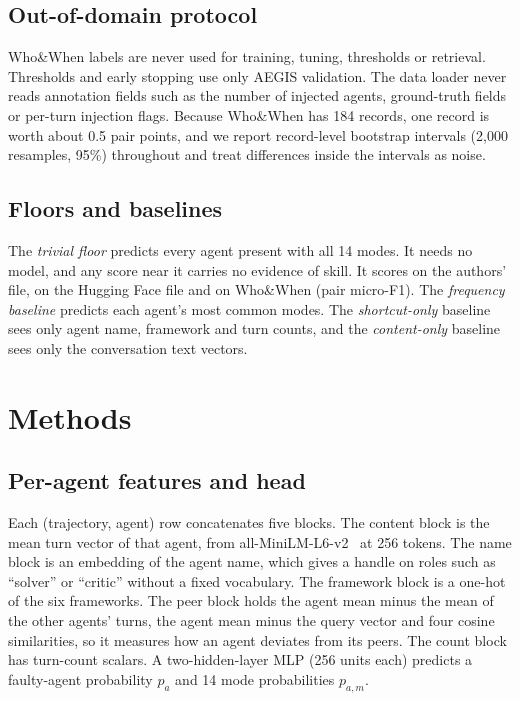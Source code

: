 \documentclass[conference]{IEEEtran}
\begin{document}
\subsection{Out-of-domain protocol}
Who\&When labels are never used for training, tuning, thresholds or retrieval. Thresholds and early stopping use only AEGIS validation. The data loader never reads annotation fields such as the number of injected agents, ground-truth fields or per-turn injection flags. Because Who\&When has 184 records, one record is worth about 0.5 pair points, and we report record-level bootstrap intervals (2,000 resamples, 95\%) throughout and treat differences inside the intervals as noise.

\subsection{Floors and baselines}
The \emph{trivial floor} predicts every agent present with all 14 modes. It needs no model, and any score near it carries no evidence of skill. It scores \floorAE{} on the authors' file, \floorHF{} on the Hugging Face file and \floorWW{} on Who\&When (pair micro-F1). The \emph{frequency baseline} predicts each agent's most common modes. The \emph{shortcut-only} baseline sees only agent name, framework and turn counts, and the \emph{content-only} baseline sees only the conversation text vectors.

\section{Methods}\label{sec:methods}
\subsection{Per-agent features and head}
Each (trajectory, agent) row concatenates five blocks. The content block is the mean turn vector of that agent, from all-MiniLM-L6-v2~\cite{minilm,sbert} at 256 tokens. The name block is an embedding of the agent name, which gives a handle on roles such as ``solver'' or ``critic'' without a fixed vocabulary. The framework block is a one-hot of the six frameworks. The peer block holds the agent mean minus the mean of the other agents' turns, the agent mean minus the query vector and four cosine similarities, so it measures how an agent deviates from its peers. The count block has turn-count scalars. A two-hidden-layer MLP (256 units each) predicts a faulty-agent probability $p_a$ and 14 mode probabilities $p_{a,m}$.
\end{document}
